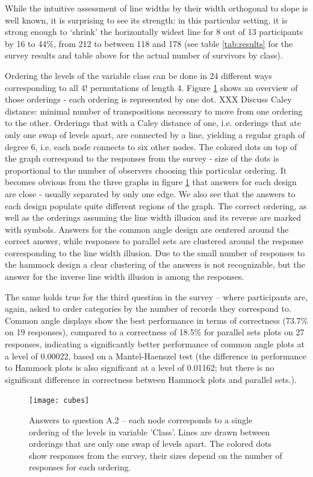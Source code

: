 While the intuitive assessment of line widths by their width orthogonal to slope is well known, it is surprising to see its strength: in this particular setting, it is strong enough to `shrink' the horizontally widest line for 8 out of 13 participants by  16 to 44\%, from 212 to between 118 and 178 (see table \ref{tab:results} for the survey results and table above for the actual number of survivors by class). 



Ordering the levels of the variable class can be done in 24 different ways corresponding to all 4! permutations of length 4. 
Figure \ref{cubes} shows an overview of those orderings - each ordering is represented by one dot. 
XXX Discuss Caley distance: minimal number of transpositions necessary to move from one ordering to the other.
Orderings that with a Caley distance of one, i.e.  orderings that ate only one swap of levels apart, are connected by a line, yielding a regular graph of degree 6, i.e.  each node connects to  six other nodes. 
The colored dots on top of the graph correspond to the responses from the survey - size of the dots is proportional to the number of observers choosing this particular ordering. It becomes obvious from the three graphs in figure \ref{cubes} that  answers for each design are close - usually separated by only one edge. We also see that the answers to each design populate quite  different regions of the graph. 
The correct ordering, as well as the orderings assuming the line width illusion and its reverse are marked with symbols. Answers for the common angle design are centered around the correct answer, while responses to parallel sets are clustered around the response corresponding to the line width illusion. Due to the small number of responses to the hammock design a clear clustering of the answers is not recognizable, but the answer for the inverse line width illusion is among the responses.

The same holds true for the third question in the survey -- where participants are, again, asked to order categories by the number of records they correspond to. Common angle displays show the best performance in terms of correctness (73.7\% on 19 responses), compared to a correctness of 18.5\% for parallel sets plots on 27 responses, indicating a significantly better performance of common angle plots at a level of 0.00022, based on a Mantel-Haenszel test (the difference in performance to Hammock plots is also significant at a level of 0.01162; but there is no significant difference in correctness between Hammock plots and parallel sets.).
\begin{figure}
\texttt{[image: cubes]}
\caption{Answers to question A.2 -- each node corresponds to a single ordering of the levels in variable 'Class'. Lines are drawn between orderings that are only one swap of levels apart. The colored dots show responses from the survey, their sizes depend on the number of responses for each ordering. }
\label{cubes}
\end{figure}

